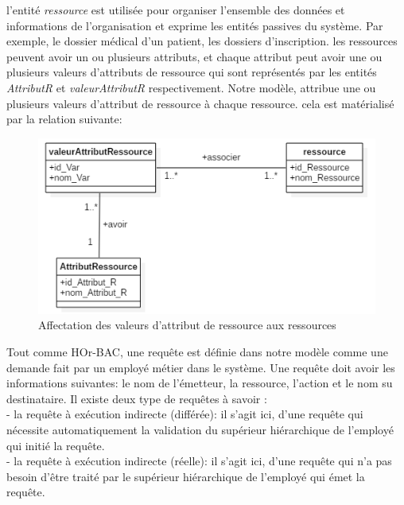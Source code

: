 \label{sectionRessource}

l'entité \textit{ressource} est utilisée pour organiser l'ensemble des données et informations de l'organisation et exprime les entités passives du système. Par exemple, le dossier médical d'un patient, les dossiers d'inscription. les ressources peuvent avoir un ou plusieurs attributs, et chaque attribut peut avoir une ou plusieurs valeurs d'attributs de ressource qui sont représentés par les entités \textit{AttributR} et \textit{valeurAttributR} respectivement. Notre modèle, attribue une ou plusieurs valeurs d'attribut de ressource à chaque ressource. cela est matérialisé par la relation suivante:

\begin{figure}[h!]
    \centering
		\includegraphics[scale=0.7]{chap3/images/ressource_attribut.png}
    \caption{Affectation des valeurs d'attribut de ressource aux ressources}
	 \label{figressource}
\end{figure} 

\label{sectionRequête}

Tout comme HOr-BAC, une requête est définie dans notre modèle comme une demande fait par un employé métier dans  le système. Une requête doit avoir les informations suivantes: le nom de l'émetteur, la ressource, l'action et le nom su destinataire. Il existe deux type de requêtes à savoir :\\
- la requête à exécution indirecte (différée): il s'agit ici, d'une requête qui nécessite automatiquement la validation du supérieur hiérarchique de l'employé qui initié la requête.\\
- la requête à exécution indirecte (réelle): il s'agit ici, d'une requête qui n'a pas besoin d'être traité par le supérieur hiérarchique de l'employé qui émet la requête. 

\label{sectionUnitéOrg}

